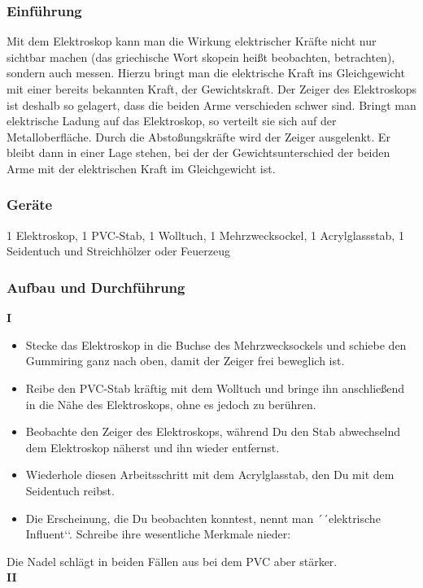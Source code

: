 \documentclass[a4paper]{report}
\begin{document}
\subsubsection{Einführung} Mit dem Elektroskop kann man die
Wirkung elektrischer Kräfte nicht nur sichtbar machen (das griechische Wort
skopein heißt beobachten, betrachten), sondern auch messen. Hierzu bringt man
die elektrische Kraft ins Gleichgewicht mit einer bereits bekannten Kraft, der
Gewichtskraft. Der Zeiger des Elektroskops ist deshalb so gelagert, dass die
beiden Arme verschieden schwer sind. Bringt man elektrische Ladung auf das
Elektroskop, so verteilt sie sich auf der Metalloberfläche. Durch die
Abstoßungskräfte wird der Zeiger ausgelenkt. Er bleibt dann in einer Lage
stehen, bei der der Gewichtsunterschied der beiden Arme mit der elektrischen
Kraft im Gleichgewicht ist. \subsubsection{Geräte} 1 Elektroskop, 1 PVC-Stab, 1
Wolltuch, 1 Mehrzwecksockel, 1 Acrylglassstab, 1 Seidentuch und Streichhölzer
oder Feuerzeug \subsubsection{Aufbau und Durchführung} \textbf{I}\\
\begin{itemize} \item Stecke das Elektroskop in die Buchse des Mehrzwecksockels
  und schiebe den Gummiring ganz nach oben, damit der Zeiger frei beweglich
  ist. \item Reibe den PVC-Stab kräftig mit dem Wolltuch und bringe ihn
  anschließend in die Nähe des Elektroskops, ohne es jedoch zu berühren. \item
  Beobachte den Zeiger des Elektroskops, während Du den Stab abwechselnd dem
  Elektroskop näherst und ihn wieder entfernst. \item Wiederhole diesen
  Arbeitsschritt mit dem Acrylglasstab, den Du mit dem Seidentuch reibst. \item
Die Erscheinung, die Du beobachten konntest, nennt man ´´elektrische
Influent‘‘. Schreibe ihre wesentliche Merkmale nieder: \end{itemize} Die Nadel
schlägt in beiden Fällen aus bei dem PVC aber stärker.\\ \textbf{II}\\
\end{document}
